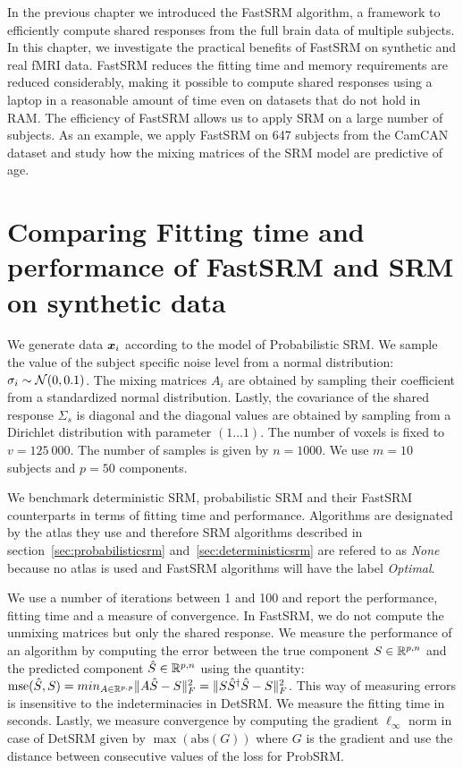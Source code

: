 In the previous chapter we introduced the FastSRM algorithm, a framework to
efficiently compute shared responses from the full brain data of multiple
subjects. In this chapter, we
investigate the practical benefits of FastSRM on synthetic and real fMRI data.
FastSRM reduces the fitting time
and memory requirements are reduced considerably, making it possible to compute
shared responses using a laptop in a reasonable amount of time even on
datasets that do not hold in RAM. The efficiency of FastSRM allows us to apply
SRM on a large number of subjects. As an example, we apply FastSRM on 647
subjects from the CamCAN dataset and study how the mixing matrices of the SRM
model are predictive of age.


\section{Comparing Fitting time and performance of FastSRM and
  SRM on synthetic data}
We generate data $\boldsymbol{x}_i$ according to the model of Probabilistic SRM. We sample the value of the subject specific noise level from a normal
distribution: $\sigma_i \sim \mathcal{N}(0, 0.1)$. The mixing matrices $A_i$
are obtained by sampling their coefficient from a standardized normal distribution.
Lastly, the covariance of the shared response $\Sigma_s$ is diagonal and the
diagonal values are obtained by sampling from a Dirichlet distribution with
parameter $(1 \dots 1)$.
The number of voxels is fixed to $v=125~000$. The number of samples is given by
$n=1000$. We use $m=10$ subjects and $p=50$ components.

We benchmark deterministic SRM, probabilistic
SRM and their FastSRM counterparts in terms of fitting time and performance.
Algorithms are designated by the atlas they use and therefore SRM algorithms described in
section~\ref{sec:probabilisticsrm} and~\ref{sec:deterministicsrm} are refered to
as \emph{None} because no atlas is used and  FastSRM algorithms will have the
label \emph{Optimal}.

We use a number of iterations between 1 and 100 and report the performance,
fitting time and a measure of convergence. In FastSRM, we do not compute the
unmixing matrices but only the shared response.
We measure the performance of an algorithm by computing the error between the true component $S \in \mathbb{R}^{p, n}$ and
the predicted component $\hat{S} \in \mathbb{R}^{p, n}$ using the quantity:
$\mathrm{mse}(\hat{S}, S) = min_{A \in \mathbb{R}^{p, p}} \|A \hat{S} - S \|^2_F =  \|S
\hat{S}^{\dagger}\hat{S} - S \|^2_F$. This way of measuring errors is
insensitive to the indeterminacies in DetSRM.
We measure the fitting time in seconds.
Lastly, we measure convergence by computing the gradient $\ell_{\infty}$ norm in
case of DetSRM given by $\max(\mathrm{abs}(G))$ where $G$ is the gradient and
use the distance between consecutive values of the loss for ProbSRM.

